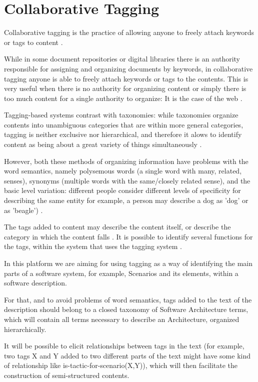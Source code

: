 \section{Collaborative Tagging}
Collaborative tagging is the practice of allowing anyone to freely attach keywords or tags to content \cite{golder2006usage}.

While in some document repositories or digital libraries there is an authority responsible for assigning and organizing documents by keywords, in collaborative tagging anyone is able to freely attach keywords or tags to the contents. This is very useful when there is no authority for organizing content or simply there is too much content for a single authority to organize: It is the case of the web \cite{golder2006usage}.

Tagging-based systems contrast with taxonomies: while taxonomies organize contents into unambiguous categories that are within more general categories, tagging is neither exclusive nor hierarchical, and therefore it alows to identify content as being about a great variety of things simultaneously \cite{golder2006usage}. 

However, both these methods of organizing information have problems with the word semantics, namely polysemous words (a single word with many, related, senses), synonyms (multiple words with the same/closely related sense), and the basic level variation: different people consider different levels of specificity for describing the same entity for example, a person may describe a dog as 'dog' or as 'beagle') \cite{tanaka1991object}. 

The tags added to content may describe the content itself, or describe the category in which the content falls \cite{coates2005two}. It is possible to identify several functions for the tags, within the system that uses the tagging system \cite{golder2006usage}.

In this platform we are aiming for using tagging as a way of identifying the main parts of a software system, for example, Scenarios and its elements, within a software description. 

For that, and to avoid problems of word semantics, tags added to the text of the description should belong to a closed taxonomy of Software Architecture terms, which will contain all terms necessary to describe an Architecture, organized hierarchically. 

It will be possible to elicit relationships between tags in the text (for example, two tags X and Y added to two different parts of the text might have some kind of relationship like is-tactic-for-scenario(X,Y)), which will then facilitate the construction of semi-structured contents.


